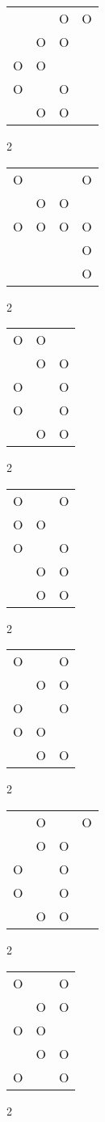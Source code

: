 \begin{tabular}{|m{0.2cm}m{0.2cm}m{0.2cm}m{0.2cm}|}\hline
 & &O&O\\
 &O&O& \\
O&O& & \\
O& &O& \\
 &O&O& \\
\hline\end{tabular}2
\begin{tabular}{|m{0.2cm}m{0.2cm}m{0.2cm}m{0.2cm}|}\hline
O& & &O\\
 &O&O& \\
O&O&O&O\\
 & & &O\\
 & & &O\\
\hline\end{tabular}2
\begin{tabular}{|m{0.2cm}m{0.2cm}m{0.2cm}|}\hline
O&O& \\
 &O&O\\
O& &O\\
O& &O\\
 &O&O\\
\hline\end{tabular}2
\begin{tabular}{|m{0.2cm}m{0.2cm}m{0.2cm}|}\hline
O& &O\\
O&O& \\
O& &O\\
 &O&O\\
 &O&O\\
\hline\end{tabular}2
\begin{tabular}{|m{0.2cm}m{0.2cm}m{0.2cm}|}\hline
O& &O\\
 &O&O\\
O& &O\\
O&O& \\
 &O&O\\
\hline\end{tabular}2
\begin{tabular}{|m{0.2cm}m{0.2cm}m{0.2cm}m{0.2cm}|}\hline
 &O& &O\\
 &O&O& \\
O& &O& \\
O& &O& \\
 &O&O& \\
\hline\end{tabular}2
\begin{tabular}{|m{0.2cm}m{0.2cm}m{0.2cm}|}\hline
O& &O\\
 &O&O\\
O&O& \\
 &O&O\\
O& &O\\
\hline\end{tabular}2
